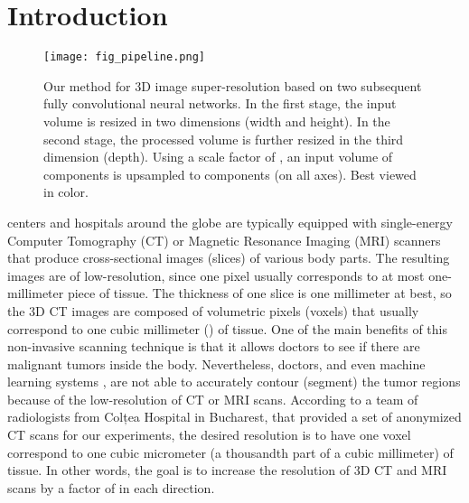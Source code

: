 \documentclass{ieeeaccess}
\begin{document}
\maketitle

\section{Introduction}

\begin{figure*}[!th]
\centering
\texttt{[image: fig\_pipeline.png]}
\caption{Our method for 3D image super-resolution based on two subsequent fully convolutional neural networks. In the first stage, the input volume is resized in two dimensions (width and height). In the second stage, the processed volume is further resized in the third dimension (depth). Using a scale factor of , an input volume of  components is upsampled to  components (on all axes). Best viewed in color.}
\label{fig_pipeline}
\end{figure*}

 centers and hospitals around the globe are typically equipped with single-energy Computer Tomography (CT) or Magnetic Resonance Imaging (MRI) scanners that produce cross-sectional images (slices) of various body parts. The resulting images are of low-resolution, since one pixel usually corresponds to at most one-millimeter piece of tissue. The thickness of one slice is one millimeter at best, so the 3D CT images are composed of volumetric pixels (voxels) that usually correspond to one cubic millimeter () of tissue. One of the main benefits of this non-invasive scanning technique is that it allows doctors to see if there are malignant tumors inside the body. Nevertheless, doctors, and even machine learning systems \cite{Sert-MH-2019}, are not able to accurately contour (segment) the tumor regions because of the low-resolution of CT or MRI scans. According to a team of radiologists from Colțea Hospital in Bucharest, that provided a set of anonymized CT scans for our experiments, the desired resolution is to have one voxel correspond to one cubic micrometer (a thousandth part of a cubic millimeter) of tissue. In other words, the goal is to increase the resolution of 3D CT and MRI scans by a factor of  in each direction.
\end{document}
